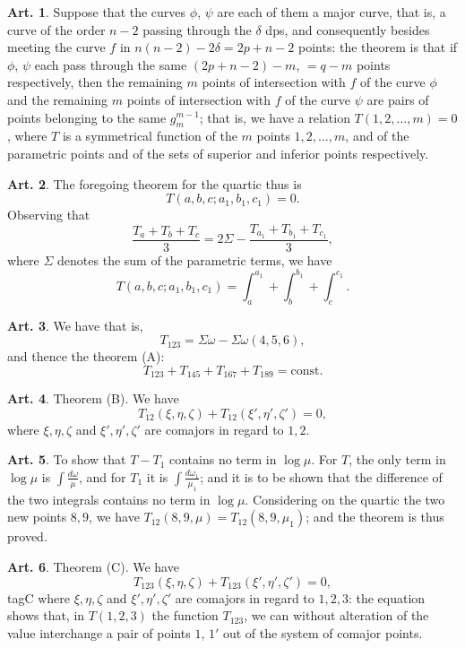 \documentclass[11pt,a4paper]{article}
\theoremstyle{definition}
\newtheorem{art}{Art.}[section]
\begin{document}
\begin{art}
Suppose that the curves $\phi$, $\psi$ are each of them a major curve, that is, a curve of the order $n-2$ passing through the $\delta$ dps, and consequently besides meeting the curve $f$ in $n(n-2)-2\delta = 2p+n-2$ points: the theorem is that if $\phi$, $\psi$ each pass through the same $(2p+n-2)-m$, $=q-m$ points respectively, then the remaining $m$ points of intersection with $f$ of the curve $\phi$ and the remaining $m$ points of intersection with $f$ of the curve $\psi$ are pairs of points belonging to the same $g_{m}^{m-1}$; that is, we have a relation $T(1,2,\ldots,m) = 0$, where $T$ is a symmetrical function of the $m$ points $1,2,\ldots,m$, and of the parametric points and of the sets of superior and inferior points respectively.
\end{art}

\begin{art}
The foregoing theorem for the quartic thus is
\[
T(a,b,c; a_1,b_1,c_1) = 0.
\]
Observing that
\[
\frac{T_a + T_b + T_c}{3} = 2\Sigma - \frac{T_{a_1} + T_{b_1} + T_{c_1}}{3},
\]
where $\Sigma$ denotes the sum of the parametric terms, we have
\[
T(a,b,c; a_1,b_1,c_1) = \int_a^{a_1} + \int_b^{b_1} + \int_c^{c_1}.
\]
\end{art}

\begin{art}
We have that is,
\[
T_{123} = \Sigma\omega - \Sigma\omega(4,5,6),
\]
and thence the theorem (A):
\[
T_{123} + T_{145} + T_{167} + T_{189} = \text{const}.
\]
\end{art}

\begin{art}
Theorem (B). We have
\[
T_{12}(\xi,\eta,\zeta) + T_{12}(\xi',\eta',\zeta') = 0,
\]
where $\xi,\eta,\zeta$ and $\xi',\eta',\zeta'$ are comajors in regard to $1,2$.
\end{art}

\begin{art}
To show that $T - T_1$ contains no term in $\log \mu$. For $T$, the only term in $\log \mu$ is $\int \frac{d\omega}{\mu}$, and for $T_1$ it is $\int \frac{d\omega_1}{\mu_1}$; and it is to be shown that the difference of the two integrals contains no term in $\log \mu$. Considering on the quartic the two new points $8,9$, we have $T_{12}(8,9,\mu) = T_{12}(8,9,\mu_1)$; and the theorem is thus proved.
\end{art}

\begin{art}
Theorem (C). We have
\[
T_{123}(\xi,\eta,\zeta) + T_{123}(\xi',\eta',\zeta') = 0,
\]
tag{C}
where $\xi,\eta,\zeta$ and $\xi',\eta',\zeta'$ are comajors in regard to $1,2,3$: the equation shows that, in $T(1,2,3)$ the function $T_{123}$, we can without alteration of the value interchange a pair of points $1$, $1'$ out of the system of comajor points.
\end{art}
\end{document}
